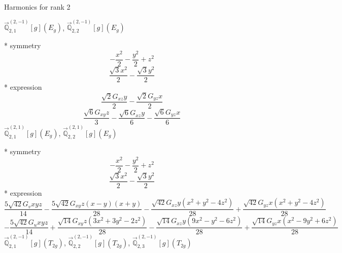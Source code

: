 \documentclass[fleqn,8pt]{jsarticle}
\begin{document}
\noindent * Harmonics for rank 2

\noindent\quad $\vec{\mathbb{Q}}_{2,1}^{(2,-1)}[g](E_{g})$, $\vec{\mathbb{Q}}_{2,2}^{(2,-1)}[g](E_{g})$

\noindent\quad ** symmetry
\begin{dmath*}
- \frac{x^{2}}{2} - \frac{y^{2}}{2} + z^{2}
\end{dmath*}
\begin{dmath*}
\frac{\sqrt{3} x^{2}}{2} - \frac{\sqrt{3} y^{2}}{2}
\end{dmath*}
\noindent\quad ** expression
\begin{dmath*}
\frac{\sqrt{2} G_{xz} y}{2} - \frac{\sqrt{2} G_{yz} x}{2}
\end{dmath*}
\begin{dmath*}
\frac{\sqrt{6} G_{xy} z}{3} - \frac{\sqrt{6} G_{xz} y}{6} - \frac{\sqrt{6} G_{yz} x}{6}
\end{dmath*}
\noindent\quad $\vec{\mathbb{Q}}_{2,1}^{(2,1)}[g](E_{g})$, $\vec{\mathbb{Q}}_{2,2}^{(2,1)}[g](E_{g})$

\noindent\quad ** symmetry
\begin{dmath*}
- \frac{x^{2}}{2} - \frac{y^{2}}{2} + z^{2}
\end{dmath*}
\begin{dmath*}
\frac{\sqrt{3} x^{2}}{2} - \frac{\sqrt{3} y^{2}}{2}
\end{dmath*}
\noindent\quad ** expression
\begin{dmath*}
\frac{5 \sqrt{42} G_{v} x y z}{14} - \frac{5 \sqrt{42} G_{xy} z \left(x - y\right) \left(x + y\right)}{28} - \frac{\sqrt{42} G_{xz} y \left(x^{2} + y^{2} - 4 z^{2}\right)}{28} + \frac{\sqrt{42} G_{yz} x \left(x^{2} + y^{2} - 4 z^{2}\right)}{28}
\end{dmath*}
\begin{dmath*}
- \frac{5 \sqrt{42} G_{u} x y z}{14} + \frac{\sqrt{14} G_{xy} z \left(3 x^{2} + 3 y^{2} - 2 z^{2}\right)}{28} - \frac{\sqrt{14} G_{xz} y \left(9 x^{2} - y^{2} - 6 z^{2}\right)}{28} + \frac{\sqrt{14} G_{yz} x \left(x^{2} - 9 y^{2} + 6 z^{2}\right)}{28}
\end{dmath*}
\noindent\quad $\vec{\mathbb{Q}}_{2,1}^{(2,-1)}[g](T_{2g})$, $\vec{\mathbb{Q}}_{2,2}^{(2,-1)}[g](T_{2g})$, $\vec{\mathbb{Q}}_{2,3}^{(2,-1)}[g](T_{2g})$
\end{document}
